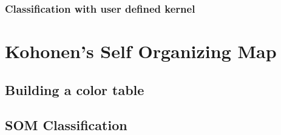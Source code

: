 \subsubsection{Classification with user defined kernel}

\ifitkFullVersion

\fi

\section{Kohonen's Self Organizing Map}
\label{sec:SOM}

\subsection{Building a color table}
\label{sec:SOMColorTable}

\subsection{SOM Classification}
\label{sec:SOMClassification}


